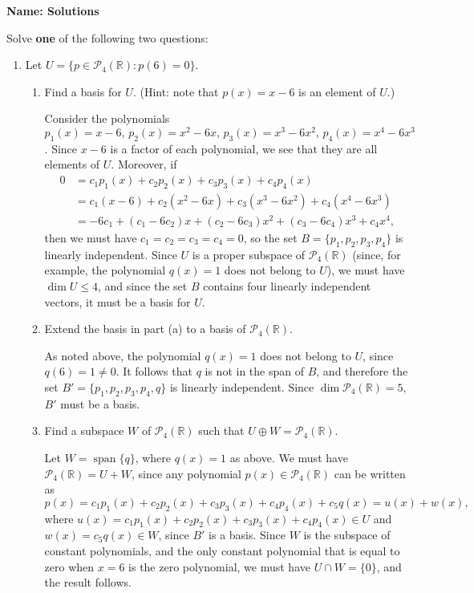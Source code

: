 \documentclass[12pt]{article}
\newcommand{\points}[1]{\marginpar{\hspace{24pt}[#1]}}
\newcommand{\R}{\mathbb{R}}
\DeclareMathOperator{\spn}{span}
\begin{document}
\thispagestyle{fancy}
{\bf Name: Solutions}

\bigskip

Solve {\bf one} of the following two questions:
 \begin{enumerate}
 \item  Let $U = \{p\in \mathcal{P}_4(\R) : p(6)=0\}$.
\begin{enumerate}
 \item Find a basis for $U$. \points{2} (Hint: note that $p(x)=x-6$ is an element of $U$.)

\bigskip

Consider the polynomials $p_1(x)=x-6,\, p_2(x) = x^2-6x,\, p_3(x) = x^3-6x^2,\, p_4(x)=x^4-6x^3$. Since $x-6$ is a factor of each polynomial, we see that they are all elements of $U$. Moreover, if
\begin{align*}
 0 & = c_1p_1(x)+c_2p_2(x)+c_3p_3(x)+c_4p_4(x)\\
& = c_1(x-6)+c_2(x^2-6x)+c_3(x^3-6x^2)+c_4(x^4-6x^3)\\
& = -6c_1+(c_1-6c_2)x+(c_2-6c_3)x^2+(c_3-6c_4)x^3+c_4x^4,
\end{align*}
then we must have $c_1=c_2=c_3=c_4=0$, so the set $B=\{p_1,p_2,p_3,p_4\}$ is linearly independent. Since $U$ is a proper subspace of $\mathcal{P}_4(\R)$ (since, for example, the polynomial $q(x)=1$ does not belong to $U$), we must have $\dim U\leq 4$, and since the set $B$ contains four linearly independent vectors, it must be a basis for $U$.

\bigskip


 \item Extend the basis in part (a) to a basis of $\mathcal{P}_4(\R)$.\points{4}

\bigskip

As noted above, the polynomial $q(x)=1$ does not belong to $U$, since $q(6)=1\neq 0$. It follows that $q$ is not in the span of $B$, and therefore the set $B' = \{p_1,p_2,p_3,p_4,q\}$ is linearly independent. Since $\dim \mathcal{P}_4(\R)=5$, $B'$ must be a basis.

\bigskip

 \item Find a subspace $W$ of $\mathcal{P}_4(\R)$ such that $U\oplus W = \mathcal{P}_4(\R)$. \points{4}

\bigskip

Let $W = \spn\{q\}$, where $q(x)=1$ as above. We must have $\mathcal{P}_4(\R) = U+W$, since any polynomial $p(x)\in \mathcal{P}_4(\R)$ can be written as
\[
 p(x) = c_1p_1(x)+c_2p_2(x)+c_3p_3(x)+c_4p_4(x)+c_5q(x) = u(x)+w(x),
\]
where $u(x)=c_1p_1(x)+c_2p_2(x)+c_3p_3(x)+c_4p_4(x)\in U$ and $w(x)=c_5q(x)\in W$, since $B'$ is a basis. Since $W$ is the subspace of constant polynomials, and the only constant polynomial that is equal to zero when $x=6$ is the zero polynomial, we must have $U\cap W=\{0\}$, and the result follows.
\end{enumerate}


\end{enumerate}
\end{document}

